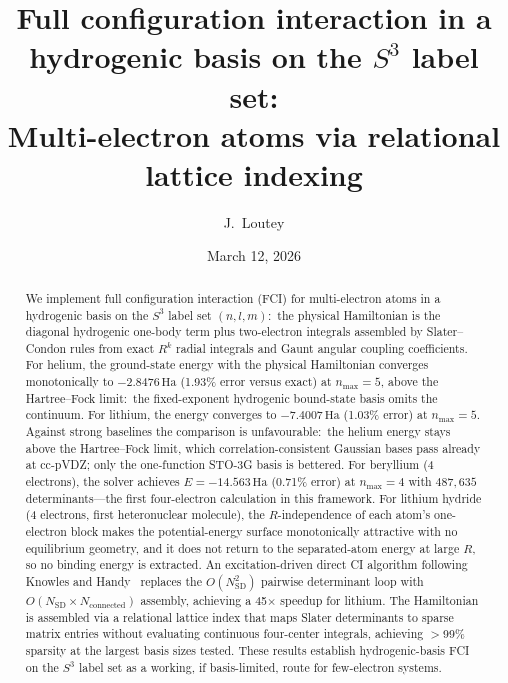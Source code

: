 \documentclass[aps,pra,twocolumn,superscriptaddress,longbibliography,floatfix]{revtex4-2}
\begin{document}
\title{Full configuration interaction in a hydrogenic basis on the $S^3$ label set:\\
Multi-electron atoms via relational lattice indexing}

\author{J.~Loutey}

\date{March 12, 2026}

\begin{abstract}
We implement full configuration interaction (FCI) for multi-electron
atoms in a hydrogenic basis on the $S^3$ label set $(n,l,m)$:\ the
physical Hamiltonian is the diagonal hydrogenic one-body term plus
two-electron integrals assembled by Slater--Condon rules from exact
$R^k$ radial integrals and Gaunt angular coupling coefficients.
For helium, the ground-state energy with the physical Hamiltonian
converges monotonically to $-2.8476\,\text{Ha}$ (1.93\% error versus
exact) at $n_{\max}=5$, above the Hartree--Fock limit:\ the fixed-exponent
hydrogenic bound-state basis omits the continuum.
For lithium, the energy converges to $-7.4007\,\text{Ha}$ (1.03\% error)
at $n_{\max}=5$.
Against strong baselines the comparison is unfavourable:\ the helium
energy stays above the Hartree--Fock limit, which correlation-consistent
Gaussian bases pass already at cc-pVDZ; only the one-function STO-3G
basis is bettered.
For beryllium (4 electrons), the solver achieves $E = -14.563\,\text{Ha}$
(0.71\% error) at $n_{\max}=4$ with $487{,}635$ determinants---the
first four-electron calculation in this framework.
For lithium hydride (4 electrons, first heteronuclear molecule), the
$R$-independence of each atom's one-electron block makes the
potential-energy surface monotonically attractive with no equilibrium
geometry, and it does not return to the separated-atom energy at large
$R$, so no binding energy is extracted.
An excitation-driven direct CI algorithm following
Knowles and Handy~\cite{Knowles1984} replaces the $O(N_{\text{SD}}^2)$
pairwise determinant loop with $O(N_{\text{SD}} \times N_{\text{connected}})$
assembly, achieving a 45$\times$ speedup for lithium.
The Hamiltonian is assembled via a relational lattice index that maps
Slater determinants to sparse matrix entries without evaluating
continuous four-center integrals, achieving $>$99\% sparsity at the
largest basis sizes tested.
These results establish hydrogenic-basis FCI on the $S^3$ label set as
a working, if basis-limited, route for few-electron systems.
\end{abstract}
\end{document}
